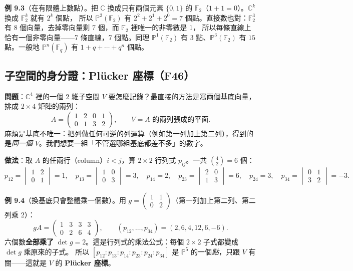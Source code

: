 \textbf{例 9.3}（在有限體上數點）。把 $\mathbb C$ 換成只有兩個元素 $\{0,1\}$ 的 $\mathbb F_2$（$1+1=0$）。$\mathbb C^k$ 換成 $\mathbb F_2^k$ 就有 $2^k$ 個點，
所以 $\mathbb P^2(\mathbb F_2)$ 有 $2^2+2^1+2^0=7$ 個點。直接數也對：$\mathbb F_2^3$ 有 $8$ 個向量，去掉零向量剩 7 個，而 $\mathbb F_2$ 裡唯一的非零數是 1，
所以每條直線上恰有一個非零向量——7 條直線，7 個點。同理 $\mathbb P^1(\mathbb F_2)$ 有 3 點、$\mathbb P^3(\mathbb F_2)$ 有 $15$ 點。一般地 $\mathbb P^n(\mathbb F_q)$ 有 $1+q+\cdots+q^n$ 個點。

\subsection{子空間的身分證：Plücker 座標（F46）}\label{sec:f-plucker}

\textbf{問題}：$\mathbb C^4$ 裡的一個 2 維子空間 $V$ 要怎麼記錄？最直接的方法是寫兩個基底向量，排成 $2\times4$ 矩陣的兩列：
\[
A=\begin{pmatrix}1&2&0&1\\0&1&3&2\end{pmatrix},\qquad V=\text{$A$ 的兩列張成的平面}.
\]
麻煩是基底不唯一：把列做任何可逆的列運算（例如第一列加上第二列），得到的是\emph{同一個} $V$。我們想要一組「不管選哪組基底都差不多」的數字。

\textbf{做法}：取 $A$ 的任兩行（column）$i<j$，算 $2\times2$ 行列式 $p_{ij}$。一共 $\binom42=6$ 個：
\[
p_{12}=\begin{vmatrix}1&2\\0&1\end{vmatrix}=1,\quad p_{13}=\begin{vmatrix}1&0\\0&3\end{vmatrix}=3,\quad p_{14}=2,\quad
p_{23}=\begin{vmatrix}2&0\\1&3\end{vmatrix}=6,\quad p_{24}=3,\quad p_{34}=\begin{vmatrix}0&1\\3&2\end{vmatrix}=-3 .
\]

\textbf{例 9.4}（換基底只會整體乘一個數）。用 $g=\begin{pmatrix}1&1\\0&2\end{pmatrix}$（第一列加上第二列、第二列乘 2）：
\[
gA=\begin{pmatrix}1&3&3&3\\0&2&6&4\end{pmatrix},\qquad (p_{12},\dots,p_{34})=(2,6,4,12,6,-6) .
\]
六個數\textbf{全部乘了} $\det g=2$。這是行列式的乘法公式：每個 $2\times2$ 子式都變成 $\det g$ 乘原來的子式。
所以 $[p_{12}:p_{13}:p_{14}:p_{23}:p_{24}:p_{34}]$ 是 $\mathbb P^5$ 的一個\emph{點}，只跟 $V$ 有關——這就是 $V$ 的 \textbf{Plücker 座標}。

